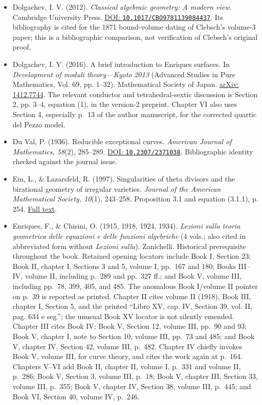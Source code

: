 \begin{sloppypar}
\begin{itemize}
\item Dolgachev, I. V. (2012). \emph{Classical algebraic geometry: A modern view}. Cambridge University Press. \href{https://doi.org/10.1017/CBO9781139084437}{DOI: \nolinkurl{10.1017/CBO9781139084437}}. Its bibliography is cited for the 1871 bound-volume dating of Clebsch's volume-3 paper; this is a bibliographic comparison, not verification of Clebsch's original proof.

\item Dolgachev, I. V. (2016). A brief introduction to Enriques surfaces. In \emph{Development of moduli theory---Kyoto 2013} (Advanced Studies in Pure Mathematics, Vol. 69, pp. 1--32). Mathematical Society of Japan. \href{https://arxiv.org/abs/1412.7744}{arXiv: 1412.7744}. The relevant conductor and tetrahedral-sextic discussion is Section 2, pp. 3--4, equation (1), in the version-2 preprint. Chapter VI also uses Section 4, especially p.~13 of the author manuscript, for the corrected quartic del Pezzo model.

\item Du Val, P. (1936). Reducible exceptional curves. \emph{American Journal of Mathematics, 58}(2), 285--289. \href{https://doi.org/10.2307/2371038}{DOI: \nolinkurl{10.2307/2371038}}. Bibliographic identity checked against the journal issue.

\item Ein, L., \& Lazarsfeld, R. (1997). Singularities of theta divisors and the birational geometry of irregular varieties. \emph{Journal of the American Mathematical Society, 10}(1), 243--258. Proposition 3.1 and equation (3.1.1), p. 254. \href{https://www.math.stonybrook.edu/~cschnell/pdf/references/EinLazarsfeld.pdf}{Full text}.

\item Enriques, F., \& Chisini, O. (1915, 1918, 1924, 1934). \emph{Lezioni sulla teoria geometrica delle equazioni e delle funzioni algebriche} (4 vols.; also cited in abbreviated form without \emph{Lezioni sulla}). Zanichelli. Historical prerequisite throughout the book. Retained opening locators include Book I, Section 23; Book II, chapter I, Sections 3 and 5, volume I, pp.~167 and 180; Books III--IV, volume II, including p.~289 and pp.~327 ff.; and Book V, volume III, including pp.~78, 399, 405, and 485. The anomalous Book I/volume II pointer on p.~39 is reported as printed. Chapter II cites volume II (1918), Book III, chapter I, Section 5, and the printed ``Libro XV, cap. IV, Section 39, vol. II, pag. 634 e seg.''; the unusual Book XV locator is not silently emended. Chapter III cites Book IV; Book V, Section 12, volume III, pp.~90 and 93; Book V, chapter I, note to Section 10, volume III, pp.~73 and 485; and Book V, chapter IV, Section 42, volume III, p.~482. Chapter IV chiefly invokes Book V, volume III, for curve theory, and cites the work again at p.~164. Chapters V--VI add Book II, chapter II, volume I, p.~331 and volume II, p.~286; Book V, Section 3, volume III, p.~18; Book V, chapter III, Section 33, volume III, p.~355; Book V, chapter IV, Section 38, volume III, p.~445; and Book VI, Section 40, volume IV, p.~246.


\end{itemize}
\end{sloppypar}
